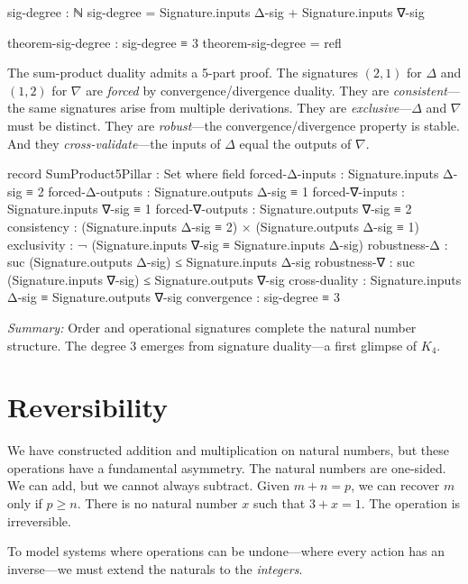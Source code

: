 \documentclass[11pt,a4paper]{book}
\begin{document}
\begin{code}
sig-degree : ℕ
sig-degree = Signature.inputs Δ-sig + Signature.inputs ∇-sig

theorem-sig-degree : sig-degree ≡ 3
theorem-sig-degree = refl
\end{code}

The sum-product duality admits a 5-part proof. The signatures $(2,1)$ for $\Delta$ and 
$(1,2)$ for $\nabla$ are \emph{forced} by convergence/divergence duality. They are 
\emph{consistent}---the same signatures arise from multiple derivations. They are 
\emph{exclusive}---$\Delta$ and $\nabla$ must be distinct. They are \emph{robust}---the 
convergence/divergence property is stable. And they \emph{cross-validate}---the inputs 
of $\Delta$ equal the outputs of $\nabla$.

\begin{code}
record SumProduct5Pillar : Set where
  field
    forced-Δ-inputs  : Signature.inputs Δ-sig ≡ 2
    forced-Δ-outputs : Signature.outputs Δ-sig ≡ 1
    forced-∇-inputs  : Signature.inputs ∇-sig ≡ 1
    forced-∇-outputs : Signature.outputs ∇-sig ≡ 2
    consistency      : (Signature.inputs Δ-sig ≡ 2) × (Signature.outputs Δ-sig ≡ 1)
    exclusivity      : ¬ (Signature.inputs ∇-sig ≡ Signature.inputs Δ-sig)
    robustness-Δ     : suc (Signature.outputs Δ-sig) ≤ Signature.inputs Δ-sig
    robustness-∇     : suc (Signature.inputs ∇-sig) ≤ Signature.outputs ∇-sig
    cross-duality    : Signature.inputs Δ-sig ≡ Signature.outputs ∇-sig
    convergence      : sig-degree ≡ 3
\end{code}

\medskip
\noindent\textit{Summary:} Order and operational signatures complete the natural number 
structure. The degree 3 emerges from signature duality—a first glimpse of $K_4$.

\chapter{Reversibility}

We have constructed addition and multiplication on natural numbers, but these operations 
have a fundamental asymmetry. The natural numbers are one-sided. We can add, but we cannot 
always subtract. Given $m + n = p$, we can recover $m$ only if $p \ge n$. There is no 
natural number $x$ such that $3 + x = 1$. The operation is irreversible.

To model systems where operations can be undone—where every action has an inverse—we 
must extend the naturals to the \emph{integers}.
\end{document}
